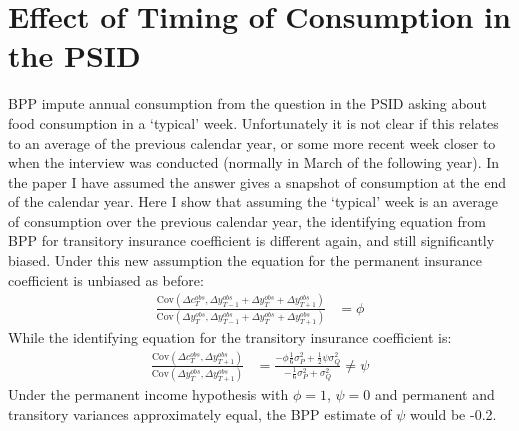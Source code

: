 \section{Effect of Timing of Consumption in the PSID} \label{typical_week}
BPP impute annual consumption from the question in the PSID asking about food consumption in a `typical' week. Unfortunately it is not clear if this relates to an average of the previous calendar year, or some more recent week closer to when the interview was conducted (normally in March of the following year). In the paper I have assumed the answer gives a snapshot of consumption at the end of the calendar year. Here I show that assuming the `typical' week is an average of consumption over the previous calendar year, the identifying equation from BPP for transitory insurance coefficient is different again, and still significantly biased. Under this new assumption the equation for the permanent insurance coefficient is unbiased as before:
\begin{align*}
\frac{\mathrm{Cov}(\Delta c^{obs}_{T}, \Delta y^{obs}_{T-1}+\Delta y^{obs}_{T}+\Delta y^{obs}_{T+1})}{\mathrm{Cov}(\Delta y^{obs}_{T}, \Delta y^{obs}_{T-1}+\Delta y^{obs}_{T}+\Delta y^{obs}_{T+1})}&= \phi
\end{align*}
While the identifying equation for the transitory insurance coefficient is:
\begin{align*}
\frac{\mathrm{Cov}(\Delta c^{obs}_{T},\Delta y^{obs}_{T+1})}{\mathrm{Cov}(\Delta y^{obs}_{T},\Delta y^{obs}_{T+1})} &= \frac{-\phi\frac{1}{6}\sigma^2_P + \frac{1}{2}\psi\sigma^2_Q}{-\frac{1}{6}\sigma^2_P + \sigma^2_Q} \neq \psi 
\end{align*}
Under the permanent income hypothesis with $\phi=1$, $\psi=0$ and permanent and transitory variances approximately equal, the BPP estimate of $\psi$ would be -0.2.